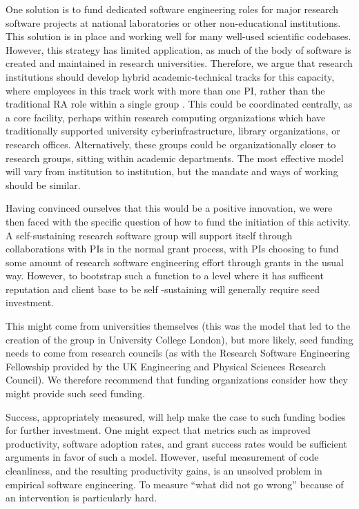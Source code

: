 One solution is to fund dedicated software engineering roles for major research software projects at national laboratories
or other non-educational institutions. This solution is in place and working well for many well-used scientific codebases.
However, this strategy has limited application, as much of the body of software is created and maintained in research
universities. Therefore, we argue that research institutions should develop hybrid academic-technical tracks for this
capacity, where employees in this track work with more than one PI, rather than the traditional RA role within a single group
. This could be coordinated centrally, as a core facility, perhaps within research computing organizations which have
traditionally supported university cyberinfrastructure, library organizations, or research offices. Alternatively, these
groups could be organizationally closer to research groups, sitting within academic departments. The most effective model
will vary from institution to institution, but the mandate and ways of working should be similar.

Having convinced ourselves that this would be a positive innovation, we were then faced with the specific question of how to
fund the initiation of this activity. A self-sustaining research software group will support itself through collaborations
with PIs in the normal grant process, with PIs choosing to fund some amount of research software engineering effort through grants in
the usual way. However, to bootstrap such a function to a level where it has sufficent reputation and client base to be self
-sustaining will generally require seed investment.

This might come from universities themselves (this was the model that led to the creation of the group in University College
London), but more likely, seed funding needs to come from research councils (as with the Research Software
Engineering Fellowship provided by the UK Engineering and Physical Sciences Research Council). We therefore recommend that
funding organizations consider how they might provide such seed funding.

Success, appropriately measured, will help make the case to such funding bodies for further investment. One might expect that metrics such as improved productivity, software adoption rates, and grant success rates would be sufficient arguments in favor of such a model. However, useful measurement of code cleanliness, and the resulting productivity gains, is an unsolved problem in empirical software engineering. To measure ``what did not go wrong'' because of an intervention is particularly hard. 

